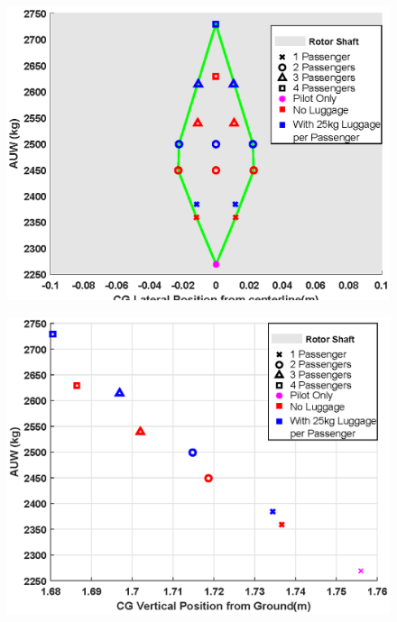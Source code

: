 \documentclass[11pt,a4paper]{article}
\begin{document}
\begin{appendices}
\begin{table}[H]
\label{tab:massb}
\end{table}
\begin{figure}[H]
\centering
\begin{minipage}{.5\textwidth}
  \centering
  \includegraphics[width=\linewidth]{CGLATVAUW.eps}
  \label{fig:CGlat}
\end{minipage}%
\begin{minipage}{.5\textwidth}
  \centering
  \includegraphics[width=\linewidth]{CGVERTVAUW.eps}
  \label{fig:CGvert}
\end{minipage}
\end{figure}


\end{appendices}
\end{document}

